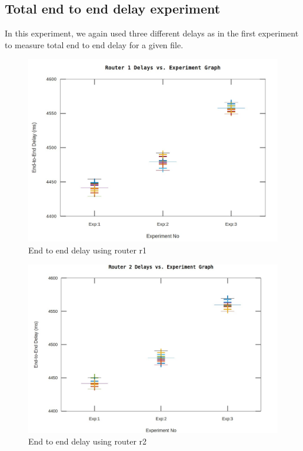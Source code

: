 \documentclass[12pt,journal,compsoc]{IEEEtran}
\begin{document}
\subsection{Total end to end delay experiment}
In this experiment, we again used three different delays as in the first experiment to measure total end to end delay for a given file.\\
\begin{figure}[h!]
\centering
\captionsetup{justification=centering}
\includegraphics[width = \linewidth]{r1_confidence.jpeg}
\caption{End to end delay using router r1}
\label{fig:r1confidence}
\end{figure}
\begin{figure}[h!]
\centering
\captionsetup{justification=centering}
\includegraphics[width = \linewidth]{r2_confidence.jpeg}
\caption{End to end delay using router r2}
\label{fig:r2confidence}
\end{figure}
\end{document}
